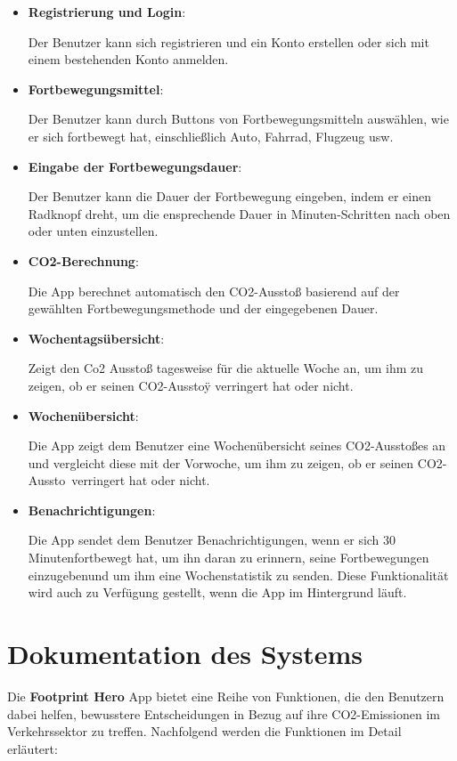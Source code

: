 \documentclass{article}
\begin{document}
\begin{itemize}
	\item \textbf{Registrierung und Login}:
	
	Der Benutzer kann sich registrieren und ein Konto erstellen oder sich mit einem bestehenden Konto anmelden.
	
	\item  \textbf{Fortbewegungsmittel}:
	
	Der Benutzer kann durch Buttons von Fortbewegungsmitteln auswählen, wie er sich fortbewegt hat, einschließlich Auto, Fahrrad, Flugzeug usw.
	
	\item \textbf{Eingabe der Fortbewegungsdauer}:
	
	Der Benutzer kann die Dauer der Fortbewegung eingeben, indem er einen Radknopf dreht, um die ensprechende Dauer in Minuten-Schritten nach oben oder unten einzustellen.
	
	\item \textbf{CO2-Berechnung}:
	
	Die App berechnet automatisch den CO2-Ausstoß basierend auf der gewählten Fortbewegungsmethode und der eingegebenen Dauer.
	
	\item \textbf{Wochentagsübersicht}:
	
	Zeigt den Co2 Ausstoß tagesweise für die aktuelle Woche an, um ihm zu zeigen, ob er seinen CO2-Ausstoÿ verringert hat oder nicht.
	
	\item \textbf{Wochenübersicht}:
	
	Die App zeigt dem Benutzer eine Wochenübersicht seines CO2-Ausstoßes an und vergleicht diese mit der Vorwoche, um ihm zu zeigen, ob er seinen CO2-Aussto\ verringert hat oder nicht.
	
	\item \textbf{Benachrichtigungen}:
	
	Die App sendet dem Benutzer Benachrichtigungen, wenn er sich 30 Minutenfortbewegt hat, um ihn daran zu erinnern, seine Fortbewegungen einzugebenund um ihm eine Wochenstatistik zu senden. Diese Funktionalität wird auch zu Verfügung gestellt, wenn die App im Hintergrund läuft.
	\end{itemize}



\section{Dokumentation des Systems}
Die \textbf{Footprint Hero} App bietet eine Reihe von Funktionen, die den Benutzern dabei helfen, bewusstere Entscheidungen in Bezug auf ihre CO2-Emissionen im Verkehrssektor zu treffen. Nachfolgend werden die Funktionen im Detail erläutert:
\end{document}
